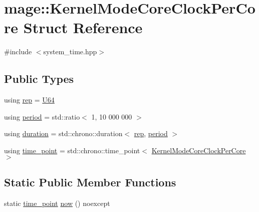 \hypertarget{structmage_1_1_kernel_mode_core_clock_per_core}{}\section{mage\+:\+:Kernel\+Mode\+Core\+Clock\+Per\+Core Struct Reference}
\label{structmage_1_1_kernel_mode_core_clock_per_core}


{\ttfamily \#include $<$system\+\_\+time.\+hpp$>$}

\subsection*{Public Types}
\begin{DoxyCompactItemize}
\item 
using \hyperlink{structmage_1_1_kernel_mode_core_clock_per_core_a436d770fc6a86e736dda04d72402eb46}{rep} = \hyperlink{namespacemage_a6672cf3c861707ce4a3235a3eb43941d}{U64}
\item 
using \hyperlink{structmage_1_1_kernel_mode_core_clock_per_core_a8baf818e6d058755e971344b5c8ff659}{period} = std\+::ratio$<$ 1, 10 \textquotesingle{}000 \textquotesingle{}000 $>$
\item 
using \hyperlink{structmage_1_1_kernel_mode_core_clock_per_core_ae159e34904ac66f359f0152291e8e6dc}{duration} = std\+::chrono\+::duration$<$ \hyperlink{structmage_1_1_kernel_mode_core_clock_per_core_a436d770fc6a86e736dda04d72402eb46}{rep}, \hyperlink{structmage_1_1_kernel_mode_core_clock_per_core_a8baf818e6d058755e971344b5c8ff659}{period} $>$
\item 
using \hyperlink{structmage_1_1_kernel_mode_core_clock_per_core_a26d0fe6b051dab6987956f52414659cc}{time\+\_\+point} = std\+::chrono\+::time\+\_\+point$<$ \hyperlink{structmage_1_1_kernel_mode_core_clock_per_core}{Kernel\+Mode\+Core\+Clock\+Per\+Core} $>$
\end{DoxyCompactItemize}
\subsection*{Static Public Member Functions}
\begin{DoxyCompactItemize}
\item 
static \hyperlink{structmage_1_1_kernel_mode_core_clock_per_core_a26d0fe6b051dab6987956f52414659cc}{time\+\_\+point} \hyperlink{structmage_1_1_kernel_mode_core_clock_per_core_aa5f2956aee985889656d0fa508dcf898}{now} () noexcept
\end{DoxyCompactItemize}
